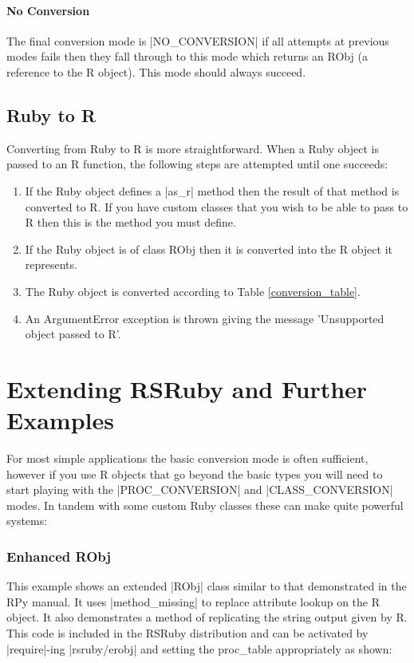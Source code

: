 \documentclass[a4paper,12pt]{book}
\begin{document}
\subsubsection{No Conversion}

The final conversion mode is |NO_CONVERSION| if all attempts at previous modes fails then they fall through to this mode which returns an RObj (a reference to the R object). This mode should always succeed.

\section{Ruby to R}

Converting from Ruby to R is more straightforward. When a Ruby object is passed to an R function, the following steps are attempted until one succeeds:

\begin{enumerate}
\item If the Ruby object defines a |as_r| method then the result of that method is converted to R. If you have custom classes that you wish to be able to pass to R then this is the method you must define.
\item If the Ruby object is of class RObj then it is converted into the R object it represents.
\item The Ruby object is converted according to Table \ref{conversion_table}.
\item An ArgumentError exception is thrown giving the message 'Unsupported object passed to R'.
\end{enumerate}

\chapter{Extending RSRuby and Further Examples}

For most simple applications the basic conversion mode is often sufficient, however if you use R objects that go beyond the basic types you will need to start playing with the |PROC_CONVERSION| and |CLASS_CONVERSION| modes. In tandem with some custom Ruby classes these can make quite powerful systems:

\subsection{Enhanced RObj}

This example shows an extended |RObj| class similar to that demonstrated in the RPy manual. It uses |method_missing| to replace attribute lookup on the R object. It also demonstrates a method of replicating the string output given by R. This code is included in the RSRuby distribution and can be activated by |require|-ing |rsruby/erobj| and setting the proc\_table appropriately as shown:
\end{document}
